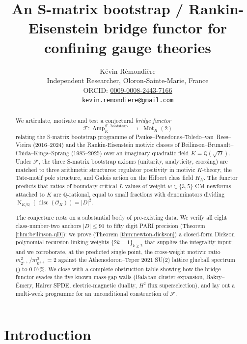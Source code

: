 \documentclass[11pt]{amsart}
\title[S-matrix bootstrap and Rankin-Eisenstein motives]{An S-matrix bootstrap / Rankin-Eisenstein
bridge functor for confining gauge theories}
\author{K\'evin R\'emondi\`ere\\
\small Independent Researcher, Oloron-Sainte-Marie, France\\
\small ORCID: \href{https://orcid.org/0009-0008-2443-7166}{0009-0008-2443-7166}\\
\small \texttt{kevin.remondiere@gmail.com}}
\theoremstyle{definition}
\theoremstyle{remark}
\DeclareMathOperator{\Nm}{N}
\DeclareMathOperator{\disc}{disc}
\DeclareMathOperator{\Amp}{Amp}
\DeclareMathOperator{\Mot}{Mot}
\newcommand{\Q}{\mathbb{Q}}
\newcommand{\OK}{\mathcal{O}_K}
\newcommand{\HK}{H_K}
\begin{document}
\begin{abstract}
We articulate, motivate and test a conjectural \emph{bridge functor}
\[
\mathcal{F} \colon \Amp_K^{S\mathrm{-bootstrap}} \;\longrightarrow\; \Mot_K(2)
\]
relating the S-matrix bootstrap programme of Paulos--Penedones--Toledo--van~Rees--Vieira
(2016--2024) and the Rankin-Eisenstein motivic classes of Beilinson--Brunault--Chida--Kings--Sprang
(1985--2025) over an imaginary quadratic field $K = \Q(\sqrt{D})$. Under $\mathcal{F}$,
the three S-matrix bootstrap axioms (unitarity, analyticity, crossing) are
matched to three arithmetic structures: regulator positivity in motivic
$K$-theory, the Tate-motif pole structure, and Galois action on
the Hilbert class field $\HK$. The functor predicts that ratios of
boundary-critical $L$-values of weight $w \in \{3, 5\}$ CM newforms attached
to $K$ are $\Q$-rational, equal to small fractions with denominators dividing
$\Nm_{K/\Q}(\disc(\OK)) = |D|^{2}$.

The conjecture rests on a substantial body of pre-existing data. We verify
all eight class-number-two anchors $|D| \le 91$ to fifty digit PARI
precision (Theorem \ref{thm:beilinson-qD}); we prove (Theorem \ref{thm:newton-dickson})
a closed-form Dickson polynomial recursion linking weights $\{2k-1\}_{k \ge 2}$
that supplies the integrality input; and we corroborate, at the predicted
single point, the cross-weight motivic ratio $m_{2^{++}}^2 / m_{0^{++}}^2 = 2$
against the Athenodorou--Teper 2021 SU(2) lattice
glueball spectrum (\cite{Athenodorou2021}) to $0.07\%$.
We close with a complete obstruction table showing how the bridge
functor evades the five known mass-gap walls (Balaban cluster expansion,
Bakry--\'Emery, Hairer SPDE, electric-magnetic duality, $H^2$ flux
superselection), and lay out a multi-week programme for an unconditional
construction of $\mathcal{F}$.
\end{abstract}

\maketitle

\tableofcontents

\section{Introduction}\label{sec:intro}
\end{document}

